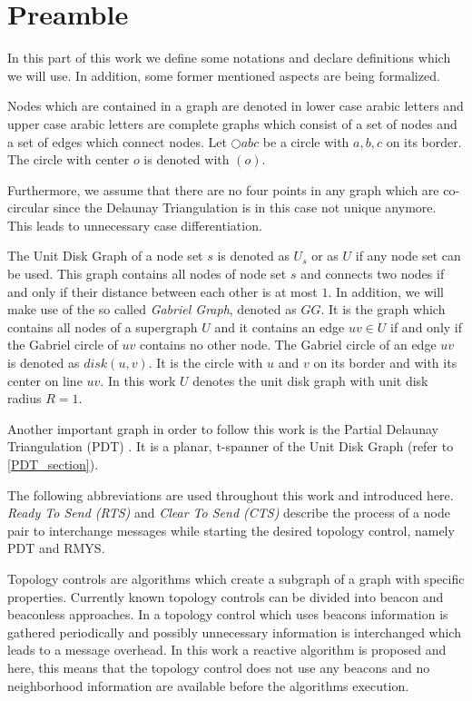 \section{Preamble}
In this part of this work we define some notations and declare definitions which we will use.
In addition, some former mentioned aspects are being formalized.

Nodes which are contained in a graph are denoted in lower case arabic letters and upper case arabic letters are complete graphs which consist of a set of nodes and a set of edges which connect nodes.
Let $\bigcirc{abc} $ be a circle with $a, b, c $ on its border.
The circle with center $o $ is denoted with $(o) $.

Furthermore, we assume that there are no four points in any graph which are co-circular since the Delaunay Triangulation is in this case not unique anymore.
This leads to unnecessary case differentiation.

The Unit Disk Graph of a node set $s $ is denoted as $U_s $ or as $U $ if any node set can be used.
This graph contains all nodes of node set $s $ and connects two nodes if and only if their distance between each other is at most $1 $.
In addition, we will make use of the so called \emph{Gabriel Graph}, denoted as $GG $. 
It is the graph which contains all nodes of a supergraph $U $ and it contains an edge $uv \in U $ if and only if the Gabriel circle of $uv $ contains no other node.
The Gabriel circle of an edge $uv $ is denoted as $disk(u, v) $.
It is the circle with $u $ and $v $ on its border and with its center on line $uv $. 
In this work $U $ denotes the unit disk graph with unit disk radius $R = 1 $.

Another important graph in order to follow this work is the Partial Delaunay Triangulation (PDT)  \cite{pdt}. It is a planar, t-spanner of the Unit Disk Graph (refer to \ref{PDT_section}).

The following abbreviations are used throughout this work and introduced here.
\emph{Ready To Send (RTS)} and \emph{Clear To Send (CTS)} describe the process of a node pair to interchange messages while starting the desired topology control, namely PDT and RMYS.

Topology controls are algorithms which create a subgraph of a graph with specific properties.
Currently known topology controls can be divided into beacon and beaconless approaches.
In a topology control which uses beacons information is gathered periodically and possibly unnecessary information is interchanged which leads to a message overhead.
In this work a reactive algorithm is proposed and here, this means that the topology control does not use any beacons and no neighborhood information are available before the algorithms execution.




